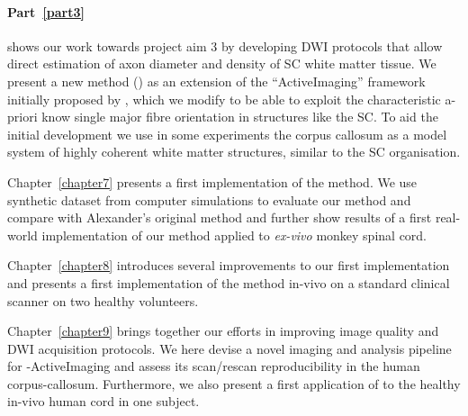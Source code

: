 \paragraph{Part~\ref{part3}} shows our work towards project aim 3 by developing \gls{DWI} protocols that allow direct estimation of axon diameter and density of SC white matter tissue. We present a new method ({\SF}) as an extension of the ``ActiveImaging'' framework initially proposed by \citet{Alexander:2008}, which we modify to be able to exploit the characteristic a-priori know single major fibre orientation in structures like the \gls{SC}. To aid the initial development we use in some experiments the corpus callosum as a model system of highly coherent white matter structures, similar to the \gls{SC} organisation.

Chapter~\ref{chapter7} presents a first implementation of the {\SF} method. We use synthetic dataset from computer simulations to evaluate our method and compare with Alexander's original method and further show results of a first real-world implementation of our method applied to \emph{ex-vivo} monkey spinal cord.

Chapter~\ref{chapter8} introduces several improvements to our first {\SF} implementation and presents a first implementation of the {\SF} method in-vivo on a standard clinical scanner on two healthy volunteers. 

Chapter~\ref{chapter9} brings together our efforts in improving image quality and \gls{DWI} acquisition protocols. We here devise a novel imaging and analysis pipeline for  {\SF}-ActiveImaging and assess its scan/rescan reproducibility in the human corpus-callosum. Furthermore, we also present a first application of {\SF} to the healthy in-vivo human cord in one subject.

